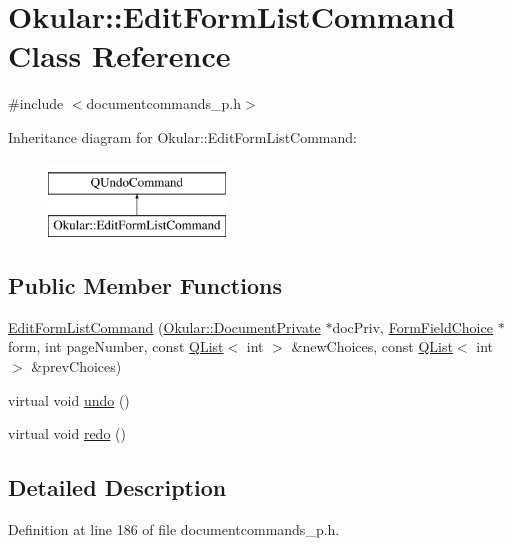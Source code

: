 \hypertarget{classOkular_1_1EditFormListCommand}{\section{Okular\+:\+:Edit\+Form\+List\+Command Class Reference}
\label{classOkular_1_1EditFormListCommand}
}


{\ttfamily \#include $<$documentcommands\+\_\+p.\+h$>$}

Inheritance diagram for Okular\+:\+:Edit\+Form\+List\+Command\+:\begin{figure}[H]
\begin{center}
\leavevmode
\includegraphics[height=2.000000cm]{classOkular_1_1EditFormListCommand}
\end{center}
\end{figure}
\subsection*{Public Member Functions}
\begin{DoxyCompactItemize}
\item 
\hyperlink{classOkular_1_1EditFormListCommand_a3ece0ff757e57629c1bd105fadec1636}{Edit\+Form\+List\+Command} (\hyperlink{classOkular_1_1DocumentPrivate}{Okular\+::\+Document\+Private} $\ast$doc\+Priv, \hyperlink{classOkular_1_1FormFieldChoice}{Form\+Field\+Choice} $\ast$form, int page\+Number, const \hyperlink{classQList}{Q\+List}$<$ int $>$ \&new\+Choices, const \hyperlink{classQList}{Q\+List}$<$ int $>$ \&prev\+Choices)
\item 
virtual void \hyperlink{classOkular_1_1EditFormListCommand_acc4747c1fa48e8b4d03913d171b1ec9a}{undo} ()
\item 
virtual void \hyperlink{classOkular_1_1EditFormListCommand_a7e2e399067ea37066377ef675d83931c}{redo} ()
\end{DoxyCompactItemize}


\subsection{Detailed Description}


Definition at line 186 of file documentcommands\+\_\+p.\+h.



